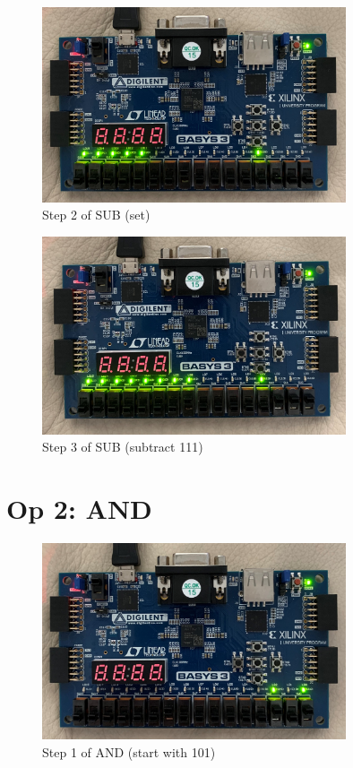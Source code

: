 \documentclass[11pt]{article}
\begin{document}
\begin{figure}[ht]\centering
	\includegraphics[width=0.8\textwidth,trim=0cm 0cm 0cm 0cm,clip]{sub_step_2}
	\caption{Step 2 of SUB (set)}
	\label{fig:sub_step_2}			
\end{figure}

\begin{figure}[ht]\centering
	\includegraphics[width=0.8\textwidth,trim=0cm 0cm 0cm 0cm,clip]{sub_step_3}
	\caption{Step 3 of SUB (subtract 111)}
	\label{fig:sub_step_3}			
\end{figure}
\clearpage

\section*{Op 2: AND}

\begin{figure}[ht]\centering
	\includegraphics[width=0.8\textwidth,trim=0cm 0cm 0cm 0cm,clip]{and_step_1}
	\caption{Step 1 of AND (start with 101)}
	\label{fig:and_step_1}			
\end{figure}
\end{document}
